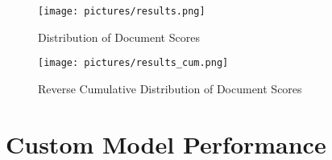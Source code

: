 \begin{figure}[ht]
    \centering 
    \texttt{[image: pictures/results.png]}
    \caption{Distribution of Document Scores}
    \label{pic:results_1}    %
\end{figure}
\begin{figure}[ht]
    \centering 
    \texttt{[image: pictures/results\_cum.png]}
    \caption{Reverse Cumulative Distribution of Document Scores}
    \label{pic:results_1_cum}    %
\end{figure}

\section{Custom Model Performance}


